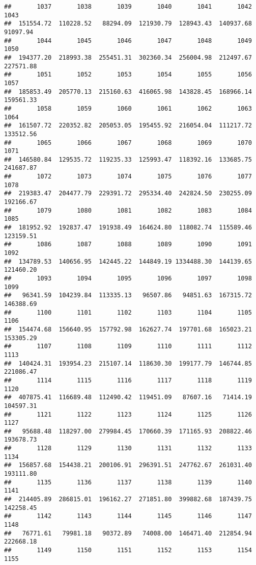 \documentclass[
]{article}
\begin{document}
\begin{verbatim}
##       1037       1038       1039       1040       1041       1042       1043 
##  151554.72  110228.52   88294.09  121930.79  128943.43  140937.68   91097.94 
##       1044       1045       1046       1047       1048       1049       1050 
##  194377.20  218993.38  255451.31  302360.34  256004.98  212497.67  227571.88 
##       1051       1052       1053       1054       1055       1056       1057 
##  185853.49  205770.13  215160.63  416065.98  143828.45  168966.14  159561.33 
##       1058       1059       1060       1061       1062       1063       1064 
##  161507.72  220352.82  205053.05  195455.92  216054.04  111217.72  133512.56 
##       1065       1066       1067       1068       1069       1070       1071 
##  146580.84  129535.72  119235.33  125993.47  118392.16  133685.75  241687.87 
##       1072       1073       1074       1075       1076       1077       1078 
##  219383.47  204477.79  229391.72  295334.40  242824.50  230255.09  192166.67 
##       1079       1080       1081       1082       1083       1084       1085 
##  181952.92  192837.47  191938.49  164624.80  118082.74  115589.46  123159.51 
##       1086       1087       1088       1089       1090       1091       1092 
##  134789.53  140656.95  142445.22  144849.19 1334488.30  144139.65  121460.20 
##       1093       1094       1095       1096       1097       1098       1099 
##   96341.59  104239.84  113335.13   96507.86   94851.63  167315.72  146388.69 
##       1100       1101       1102       1103       1104       1105       1106 
##  154474.68  156640.95  157792.98  162627.74  197701.68  165023.21  153305.29 
##       1107       1108       1109       1110       1111       1112       1113 
##  140424.31  193954.23  215107.14  118630.30  199177.79  146744.85  221086.47 
##       1114       1115       1116       1117       1118       1119       1120 
##  407875.41  116689.48  112490.42  119451.09   87607.16   71414.19  104597.31 
##       1121       1122       1123       1124       1125       1126       1127 
##   95688.48  118297.00  279984.45  170660.39  171165.93  208822.46  193678.73 
##       1128       1129       1130       1131       1132       1133       1134 
##  156857.68  154438.21  200106.91  296391.51  247762.67  261031.40  193111.80 
##       1135       1136       1137       1138       1139       1140       1141 
##  214405.89  286815.01  196162.27  271851.80  399882.68  187439.75  142258.45 
##       1142       1143       1144       1145       1146       1147       1148 
##   76771.61   79981.18   90372.89   74008.00  146471.40  212854.94  222668.18 
##       1149       1150       1151       1152       1153       1154       1155 

\end{verbatim}
\end{document}
